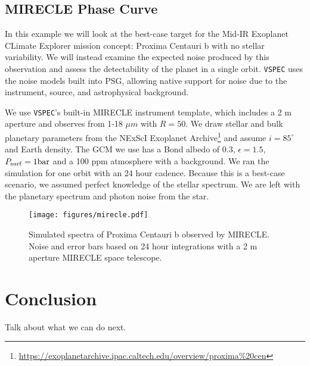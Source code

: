 \documentclass[twocolumn]{aastex631}
\newcommand{\TJ}[1]{\textcolor{tedcommentcolor}{#1}}
\newcommand{\vspec}[1]{\texttt{VSPEC}#1}
\begin{document}
\subsection{MIRECLE Phase Curve}
In this example we will look at the best-case target for the Mid-IR Exoplanet CLimate Explorer \citep[MIRECLE,][]{mandell2022}
mission concept: Proxima Centauri b with no stellar variability. We will instead examine the expected noise produced by this observation
and assess the detectability of the planet in a single orbit. \vspec{} uses the noise models built into PSG, allowing native support for
noise due to the instrument, source, and astrophysical background.

We use \vspec{}'s built-in MIRECLE instrument template, which includes a 2 m aperture and observes from 1-18 $\mu m$ with $R=50$.
We draw stellar and bulk planetary parameters from the NExScI Exoplanet Archive\footnote{\url{https://exoplanetarchive.ipac.caltech.edu/overview/proxima\%20cen}}
and assume $i=85^\circ$ and Earth density. The GCM we use has a Bond albedo of 0.3, $\epsilon=1.5$, $P_{\rm surf} = 1 \text{bar}$ and a 100 ppm  atmosphere with a  background.
We ran the simulation for one orbit with an 24 hour cadence. Because this is a best-case scenario, we assumed perfect knowledge of the stellar spectrum.
We are left with the planetary spectrum and photon noise from the star.

\begin{figure}
    \centering
    \texttt{[image: figures/mirecle.pdf]}
    \caption{
        Simulated spectra of Proxima Centauri b observed by MIRECLE. Noise and error bars based on 24 hour integrations with a 2 m aperture MIRECLE
        space telescope.
        }
    \label{fig:mirecle}
\end{figure}

\section{Conclusion \label{sec:conclusion}}
\TJ{Talk about what we can do next.}


\end{document}
